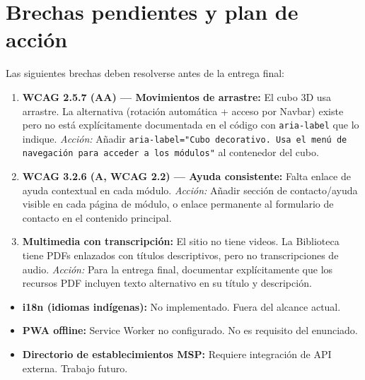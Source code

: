 \documentclass[12pt, a4paper]{article}
\begin{document}
\section{Brechas pendientes y plan de acción}

\begin{warnbox}
Las siguientes brechas deben resolverse antes de la entrega final:
\begin{enumerate}
  \item \textbf{WCAG 2.5.7 (AA) --- Movimientos de arrastre:} El cubo 3D usa arrastre. La alternativa (rotación automática + acceso por Navbar) existe pero no está explícitamente documentada en el código con \texttt{aria-label} que lo indique. \textit{Acción:} Añadir \texttt{aria-label="Cubo decorativo. Usa el menú de navegación para acceder a los módulos"} al contenedor del cubo.
  \item \textbf{WCAG 3.2.6 (A, WCAG 2.2) --- Ayuda consistente:} Falta enlace de ayuda contextual en cada módulo. \textit{Acción:} Añadir sección de contacto/ayuda visible en cada página de módulo, o enlace permanente al formulario de contacto en el contenido principal.
  \item \textbf{Multimedia con transcripción:} El sitio no tiene videos. La Biblioteca tiene PDFs enlazados con títulos descriptivos, pero no transcripciones de audio. \textit{Acción:} Para la entrega final, documentar explícitamente que los recursos PDF incluyen texto alternativo en su título y descripción.
\end{enumerate}
\end{warnbox}

\begin{infobox}
\begin{itemize}
  \item \textbf{i18n (idiomas indígenas):} No implementado. Fuera del alcance actual.
  \item \textbf{PWA offline:} Service Worker no configurado. No es requisito del enunciado.
  \item \textbf{Directorio de establecimientos MSP:} Requiere integración de API externa. Trabajo futuro.
\end{itemize}
\end{infobox}
\end{document}
